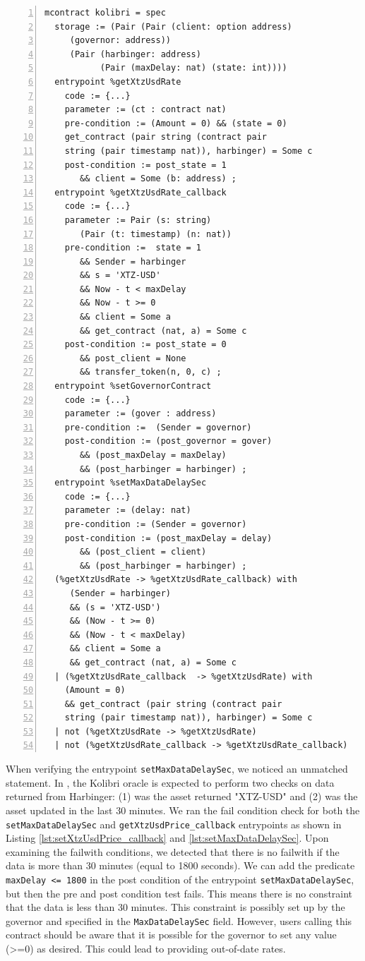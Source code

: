 \documentclass[a4paper,USenglish,cleveref, autoref,anonymous]{lipics-v2021}
\begin{document}
\begin{lstlisting}[float=tp,captionpos=b,caption={Kolibri oracle contract specification},label={lst:kolibri-contract-specification},numbers=left]
mcontract kolibri = spec 
  storage := (Pair (Pair (client: option address) 
     (governor: address))
     (Pair (harbinger: address) 
           (Pair (maxDelay: nat) (state: int))))
  entrypoint %getXtzUsdRate
    code := {...}
    parameter := (ct : contract nat) 
    pre-condition := (Amount = 0) && (state = 0)
    get_contract (pair string (contract pair 
    string (pair timestamp nat)), harbinger) = Some c
    post-condition := post_state = 1
       && client = Some (b: address) ;
  entrypoint %getXtzUsdRate_callback
    code := {...}
    parameter := Pair (s: string) 
       (Pair (t: timestamp) (n: nat))
    pre-condition :=  state = 1 
       && Sender = harbinger  
       && s = 'XTZ-USD' 
       && Now - t < maxDelay 
       && Now - t >= 0 
       && client = Some a 
       && get_contract (nat, a) = Some c    
    post-condition := post_state = 0 
       && post_client = None 
       && transfer_token(n, 0, c) ;
  entrypoint %setGovernorContract
    code := {...}
    parameter := (gover : address) 
    pre-condition :=  (Sender = governor)                  
    post-condition := (post_governor = gover) 
       && (post_maxDelay = maxDelay) 
       && (post_harbinger = harbinger) ;
  entrypoint %setMaxDataDelaySec
    code := {...}
    parameter := (delay: nat)
    pre-condition := (Sender = governor)             
    post-condition := (post_maxDelay = delay) 
       && (post_client = client) 
       && (post_harbinger = harbinger) ;
  (%getXtzUsdRate -> %getXtzUsdRate_callback) with
     (Sender = harbinger)
     && (s = 'XTZ-USD') 
     && (Now - t >= 0)  
     && (Now - t < maxDelay)  
     && client = Some a 
     && get_contract (nat, a) = Some c    
  | (%getXtzUsdRate_callback  -> %getXtzUsdRate) with 
    (Amount = 0) 
    && get_contract (pair string (contract pair 
    string (pair timestamp nat)), harbinger) = Some c
  | not (%getXtzUsdRate -> %getXtzUsdRate) 
  | not (%getXtzUsdRate_callback -> %getXtzUsdRate_callback)
\end{lstlisting}
When verifying the entrypoint \lstinline/setMaxDataDelaySec/, we noticed an unmatched statement. In \cite{kolibri}, the Kolibri oracle is expected to perform two checks on data returned from Harbinger: (1) was the asset returned "XTZ-USD" and (2) was the asset updated in the last 30 minutes. We ran the fail condition check for both the \lstinline/setMaxDataDelaySec/ and \lstinline/getXtzUsdPrice_callback/ entrypoints as shown in Listing \ref{lst:setXtzUsdPrice_callback} and \ref{lst:setMaxDataDelaySec}. Upon examining the failwith conditions, we detected that there is no failwith if the data is more than 30 minutes (equal to 1800 seconds). We can add the predicate \lstinline/maxDelay <= 1800/ in the post condition of the entrypoint \lstinline/setMaxDataDelaySec/, but then the pre and post condition test fails. This means there is no constraint that the data is less than 30 minutes. This constraint is possibly set up by the governor and specified in the \lstinline/MaxDataDelaySec/ field. However, users calling this contract should be aware that it is possible for the governor to set any value (>=0) as desired. This could lead to providing out-of-date rates.
\end{document}
